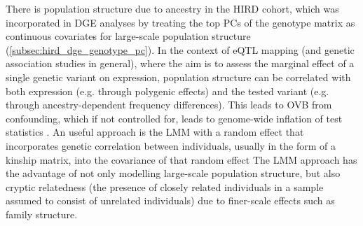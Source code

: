 There is population structure due to ancestry in the \gls{HIRD} cohort,
which was incorporated in \gls{DGE} analyses by treating the top \glspl{PC} of the genotype matrix as continuous covariates for large-scale population structure (\autoref{subsec:hird_dge_genotype_pc}).
In the context of \gls{eQTL} mapping (and genetic association studies in general), 
where the aim is to assess the marginal effect of a single genetic variant on expression, 
population structure can be correlated with both expression (e.g. through polygenic effects)
and the tested variant (e.g. through ancestry-dependent frequency differences).
This leads to \gls{OVB} from confounding, which if not controlled for, leads to genome-wide inflation of test statistics \autocite{price2010NewApproachesPopulation}.
%
An useful approach is the \gls{LMM} with a random effect that incorporates genetic correlation between individuals, usually in the form of a kinship matrix, into the covariance of that random effect\autocite{price2010NewApproachesPopulation, eu-ahsunthornwattana2014ComparisonMethodsAccount, golan2018MixedModelsCaseControl}
The \gls{LMM} approach has the advantage of not only modelling large-scale population structure, but also cryptic relatedness (the presence of closely related individuals in a sample assumed to consist of unrelated individuals\autocite{astle2009PopulationStructureCryptic}) due to finer-scale effects such as family structure\autocite{golan2018MixedModelsCaseControl}.
%

